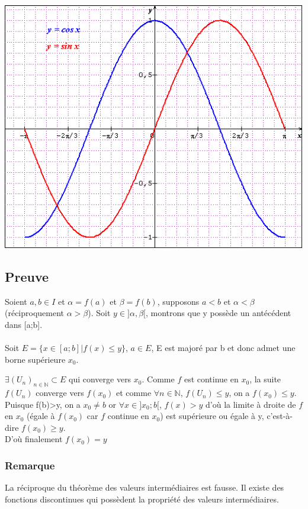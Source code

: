 \documentclass[a4paper,10pt]{book} %
\newcommand{\N}{\mathbb{N}}
\begin{document}
\begin{center}
\includegraphics[scale=0.6]{images/001.png}
\end{center}

\subsection{Preuve}
Soient $a,b \in I$ et $\alpha=f(a)$ et $\beta=f(b)$, supposons $a<b$ et $\alpha<\beta$ (réciproquement $\alpha>\beta$).
Soit $y\in ]\alpha,\beta[$, montrons que y possède un antécédent dans [a;b].\\\\
Soit $E=\{x\in[a;b] | f(x)\leq y\}$, $a\in E$, E est majoré par b et donc admet une borne supérieure $x_{0}$.

$\exists (U_{n})_{n\in\N}\subset E$ qui converge vers $x_{0}$. Comme $f$ est continue en $x_{0}$, la suite $f(U_{n})$ converge vers $f(x_{0})$ et comme $\forall n\in\N$, $f(U_{n})\leq y$, on a $f(x_{0})\leq y$.\\

Puisque f(b)>y, on a $x_{0}\neq b$ or $\forall x\in ]x_{0};b[$, $f(x)>y$ d'où la limite à droite de $f$ en $x_{0}$ (égale à $f(x_{0})$ car $f$ continue en $x_{0}$) est supérieure ou égale à y, c'est-à-dire $f(x_{0})\geq y$.\\

D'où finalement $f(x_{0})=y$

\subsubsection{Remarque}
La réciproque du théorème des valeurs intermédiaires est fausse. Il existe des fonctions discontinues qui possèdent la propriété des valeurs intermédiaires.
\end{document}
